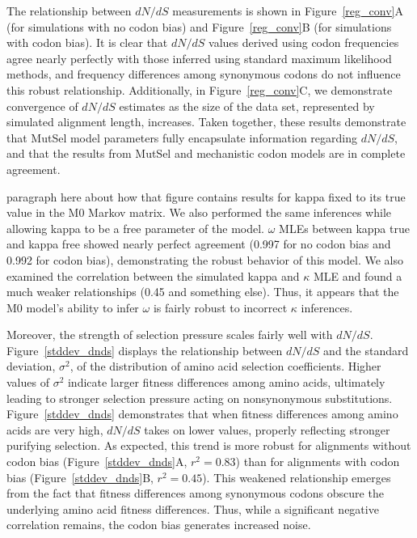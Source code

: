 \documentclass[11pt]{article}
\begin{document}
The relationship between $dN/dS$ measurements is shown in Figure~\ref{reg_conv}A (for simulations with no codon bias) and Figure~\ref{reg_conv}B (for simulations with codon bias). It is clear that $dN/dS$ values derived using codon frequencies agree nearly perfectly with those inferred using standard maximum likelihood methods, and frequency differences among synonymous codons do not influence this robust relationship. Additionally, in Figure~\ref{reg_conv}C, we demonstrate convergence of $dN/dS$ estimates as the size of the data set, represented by simulated alignment length, increases. Taken together, these results demonstrate that MutSel model parameters fully encapsulate information regarding $dN/dS$, and that the results from MutSel and mechanistic codon models are in complete agreement.

paragraph here about how that figure contains results for kappa fixed to its true value in the M0 Markov matrix. We also performed the same inferences while allowing kappa to be a free parameter of the model. $\omega$ MLEs between kappa true and kappa free showed nearly perfect agreement (0.997 for no codon bias and 0.992 for codon bias), demonstrating the robust behavior of this model. We also examined the correlation between the simulated kappa and $\kappa$ MLE and found a much weaker relationships (0.45 and something else). Thus, it appears that the M0 model's ability to infer $\omega$ is fairly robust to incorrect $\kappa$ inferences.


Moreover, the strength of selection pressure scales fairly well with $dN/dS$. Figure~\ref{stddev_dnds} displays the relationship between $dN/dS$ and the standard deviation, $\sigma^2$, of the distribution of amino acid selection coefficients. Higher values of $\sigma^2$ indicate larger fitness differences among amino acids, ultimately leading to stronger selection pressure acting on nonsynonymous substitutions. Figure~\ref{stddev_dnds} demonstrates that when fitness differences among amino acids are very high, $dN/dS$ takes on lower values, properly reflecting stronger purifying selection. As expected, this trend is more robust for alignments without codon bias (Figure~\ref{stddev_dnds}A, $r^2 = 0.83$) than for alignments with codon bias (Figure~\ref{stddev_dnds}B, $r^2 = 0.45$). This weakened relationship emerges from the fact that fitness differences among synonymous codons obscure the underlying amino acid fitness differences. Thus, while a significant negative correlation remains, the codon bias generates increased noise.
\end{document}
